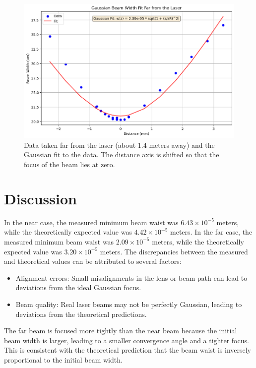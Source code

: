 \documentclass[12pt]{article}
\begin{document}
\begin{figure}[H]
    \centering
    \includegraphics[width=1\linewidth]{far_fit.png}
    \caption{Data taken far from the laser (about 1.4 meters away) and the Gaussian fit to the data. The distance axis is shifted so that the focus of the beam lies at zero.}
    \label{fig:far-fit}
\end{figure}

\section{Discussion}
In the near case, the measured minimum beam waist was \(6.43 \times 10^{-5}\) meters, while the theoretically expected value was \(4.42 \times 10^{-5}\) meters. In the far case, the measured minimum beam waist was \(2.09 \times 10^{-5}\) meters, while the theoretically expected value was \(3.20 \times 10^{-5}\) meters. The discrepancies between the measured and theoretical values can be attributed to several factors:
\begin{itemize}
    \item Alignment errors: Small misalignments in the lens or beam path can lead to deviations from the ideal Gaussian focus.
    \item Beam quality: Real laser beams may not be perfectly Gaussian, leading to deviations from the theoretical predictions.
\end{itemize}

The far beam is focused more tightly than the near beam because the initial beam width is larger, leading to a smaller convergence angle and a tighter focus. This is consistent with the theoretical prediction that the beam waist is inversely proportional to the initial beam width.
\end{document}
